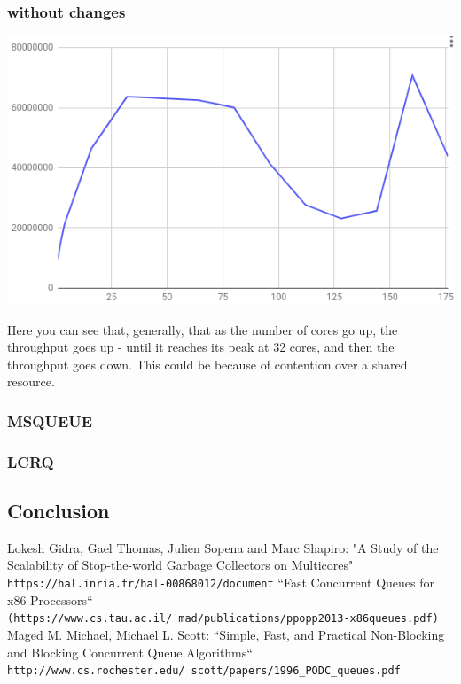 \documentclass{article}
\begin{document}
 \subsubsection{without changes}

 \includegraphics[width=\textwidth]{graph-no-changes.png}

 Here you can see that, generally, that as the number of cores go up, the throughput goes up - until it reaches its peak at 32 cores, and then the throughput goes down. This could be because of contention over a shared resource.
 

 \subsubsection{MSQUEUE}

 \subsubsection{LCRQ}

 \subsection{Conclusion}

  \medskip
  \newpage

  \begin{thebibliography}{9}
      Lokesh Gidra, Gael Thomas, Julien Sopena and Marc Shapiro: "A Study of the Scalability of Stop-the-world Garbage Collectors on Multicores"
      \\\texttt{https://hal.inria.fr/hal-00868012/document}
      ``Fast Concurrent Queues for x86 Processors``
      \\\texttt{(https://www.cs.tau.ac.il/~mad/publications/ppopp2013-x86queues.pdf)}
	    Maged M. Michael, Michael L. Scott: ``Simple, Fast, and Practical Non-Blocking and Blocking Concurrent Queue Algorithms``
      \\\texttt{http://www.cs.rochester.edu/~scott/papers/1996\_PODC\_queues.pdf}
  \end{thebibliography}
\end{document}
